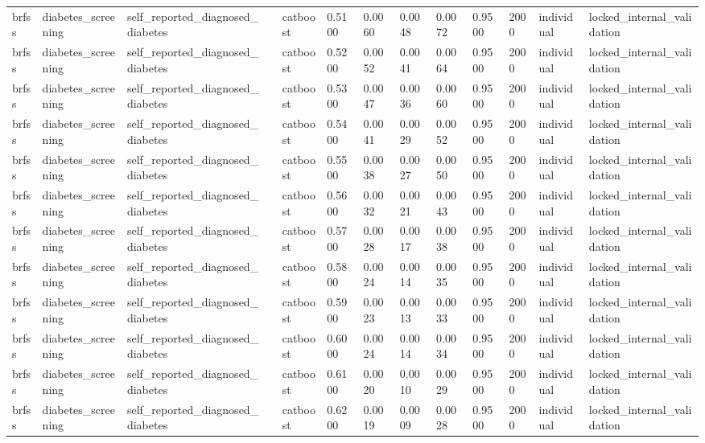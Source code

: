 \begin{tabular}{lllllllllllll}
brfss & diabetes\_screening & self\_reported\_diagnosed\_diabetes &  & catboost & 0.5100 & 0.0060 & 0.0048 & 0.0072 & 0.9500 & 2000 & individual & locked\_internal\_validation \\
brfss & diabetes\_screening & self\_reported\_diagnosed\_diabetes &  & catboost & 0.5200 & 0.0052 & 0.0041 & 0.0064 & 0.9500 & 2000 & individual & locked\_internal\_validation \\
brfss & diabetes\_screening & self\_reported\_diagnosed\_diabetes &  & catboost & 0.5300 & 0.0047 & 0.0036 & 0.0060 & 0.9500 & 2000 & individual & locked\_internal\_validation \\
brfss & diabetes\_screening & self\_reported\_diagnosed\_diabetes &  & catboost & 0.5400 & 0.0041 & 0.0029 & 0.0052 & 0.9500 & 2000 & individual & locked\_internal\_validation \\
brfss & diabetes\_screening & self\_reported\_diagnosed\_diabetes &  & catboost & 0.5500 & 0.0038 & 0.0027 & 0.0050 & 0.9500 & 2000 & individual & locked\_internal\_validation \\
brfss & diabetes\_screening & self\_reported\_diagnosed\_diabetes &  & catboost & 0.5600 & 0.0032 & 0.0021 & 0.0043 & 0.9500 & 2000 & individual & locked\_internal\_validation \\
brfss & diabetes\_screening & self\_reported\_diagnosed\_diabetes &  & catboost & 0.5700 & 0.0028 & 0.0017 & 0.0038 & 0.9500 & 2000 & individual & locked\_internal\_validation \\
brfss & diabetes\_screening & self\_reported\_diagnosed\_diabetes &  & catboost & 0.5800 & 0.0024 & 0.0014 & 0.0035 & 0.9500 & 2000 & individual & locked\_internal\_validation \\
brfss & diabetes\_screening & self\_reported\_diagnosed\_diabetes &  & catboost & 0.5900 & 0.0023 & 0.0013 & 0.0033 & 0.9500 & 2000 & individual & locked\_internal\_validation \\
brfss & diabetes\_screening & self\_reported\_diagnosed\_diabetes &  & catboost & 0.6000 & 0.0024 & 0.0014 & 0.0034 & 0.9500 & 2000 & individual & locked\_internal\_validation \\
brfss & diabetes\_screening & self\_reported\_diagnosed\_diabetes &  & catboost & 0.6100 & 0.0020 & 0.0010 & 0.0029 & 0.9500 & 2000 & individual & locked\_internal\_validation \\
brfss & diabetes\_screening & self\_reported\_diagnosed\_diabetes &  & catboost & 0.6200 & 0.0019 & 0.0009 & 0.0028 & 0.9500 & 2000 & individual & locked\_internal\_validation \\

\end{tabular}
